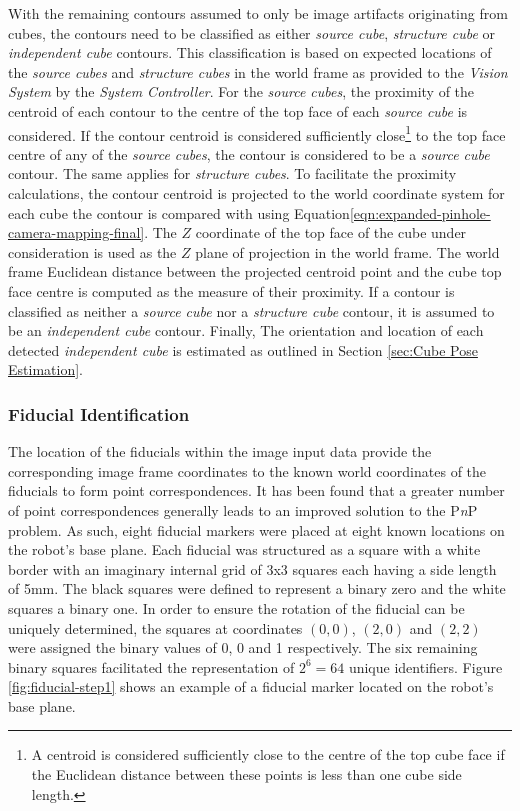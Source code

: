With the remaining contours assumed to only be image artifacts originating from cubes, the contours need to be classified as either \textit{source cube}, \textit{structure cube} or \textit{independent cube} contours. This classification is based on expected locations of the \textit{source cubes} and \textit{structure cubes} in the world frame as provided to the \textit{Vision System} by the \textit{System Controller}. For the \textit{source cubes}, the proximity of the centroid of each contour to the centre of the top face of each \textit{source cube} is considered. If the contour centroid is considered sufficiently close\footnote{A centroid is considered sufficiently close to the centre of the top cube face if the Euclidean distance between these points is less than one cube side length.} to the top face centre of any of the \textit{source cubes}, the contour is considered to be a \textit{source cube} contour. The same applies for \textit{structure cubes}. To facilitate the proximity calculations, the contour centroid is projected to the world coordinate system for each cube the contour is compared with using Equation\ref{eqn:expanded-pinhole-camera-mapping-final}. The $Z$ coordinate of the top face of the cube under consideration is used as the $Z$ plane of projection in the world frame. The world frame Euclidean distance between the projected centroid point and the cube top face centre is computed as the measure of their proximity. If a contour is classified as neither a \textit{source cube} nor a \textit{structure cube} contour, it is assumed to be an \textit{independent cube} contour. Finally, The orientation and location of each detected \textit{independent cube} is estimated as outlined in Section \ref{sec:Cube Pose Estimation}.


\subsubsection{Fiducial Identification} \label{sec:Fiducial Identification}

The location of the fiducials within the image input data provide the corresponding image frame coordinates to the known world coordinates of the fiducials to form point correspondences. It has been found that a greater number of point correspondences generally leads to an improved solution to the P\textit{n}P problem. As such, eight fiducial markers were placed at eight known locations on the robot's base plane. Each fiducial was structured as a square with a white border with an imaginary internal grid of 3x3 squares each having a side length of 5mm. The black squares were defined to represent a binary zero and the white squares a binary one. In order to ensure the rotation of the fiducial can be uniquely determined, the squares at coordinates $(0, 0)$, $(2, 0)$ and $(2,2)$ were assigned the binary values of 0, 0 and 1 respectively. The six remaining binary squares facilitated the representation of $2^6=64$ unique identifiers. Figure \ref{fig:fiducial-step1} shows an example of a fiducial marker located on the robot's base plane. 

